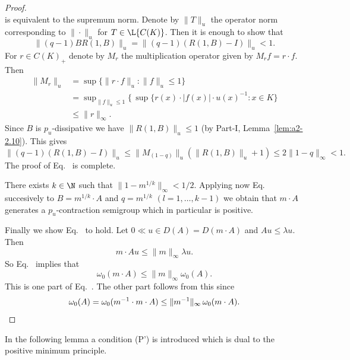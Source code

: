 \begin{proof}
\[\]
is equivalent to the supremum norm.
Denote by $\|T\|_{u}$ the operator norm corresponding to $\|\cdot\|_{u}$ for $T \in \L{C(K)}$.
Then it is enough to show that 
%
\[
	 \|(q-1)BR(1,B)\|_{u} = \|(q-1)(R(1,B) - I)\|_{u} < 1 .
\]
%
For $r \in C(K)_{+}$ denote by $M_{r}$ the multiplication operator given by $M_{r}f = r \cdot f$.
Then 
\begin{align*}
	    \|M_{r}\|_{u} &= \sup\{\|r \cdot f\|_{u} \colon \|f\|_{u} \leq 1\} \\
	              &= \sup\nolimits_{\|f\|_{u} \leq 1}\{ \, 
	              \sup \{ r(x) \cdot |f(x)| \cdot u(x)^{-1}  \colon {x \in K} \}  \\
	              &\leq \|r\|_{\infty}.
\end{align*}
Since $B$ is $p_{u}$-dissipative we have $\|R(1,B)\|_{u} \leq 1$ (by Part-I, Lemma~\ref{lem:a2-2.10}).
This gives 
%
\[
	\|(q-1)(R(1,B) - I)\|_{u} \leq \|M_{(1-q)}\|_{u}(\|R(1,B)\|_{u} + 1) \leq 2\|1 - q\|_{\infty} < 1 .
\]
%
The proof of Eq.~ is complete.

There exists $k \in \N$ such that $\|1 - m^{1/k}\|_{\infty} < 1/2$.
Applying now Eq.~ 
succesively to $B = m^{1/k} \cdot A$ and $q = m^{1/k}$ $(l = 1, \ldots, k-1)$ we obtain that $m \cdot A$ generates a $p_{u}$-contraction semigroup which in particular is positive.

Finally we show Eq.~ to hold.
Let $0 \ll u \in D(A) = D(m \cdot A)$ and $Au \leq \lambda u$.
Then 
%
\[
	m \cdot Au \leq \|m\|_{\infty}\lambda u .
\]
%
So Eq.~ implies that
%
\[
	  \omega_{0}(m \cdot A) \leq \|m\|_{\infty}\omega_{0}(A) .
\]
%
This is one part of Eq.~. 
The other part follows from this since 
%
\[
	\omega_{0}(A) = \omega_{0}(m^{-1} \cdot m \cdot A) \leq \|m^{-1}\|_{\infty} \, \omega_{0}(m \cdot A).
	\qedhere
\]
%
\end{proof}
In the following lemma a condition (P') is introduced which is dual to the positive minimum principle.

